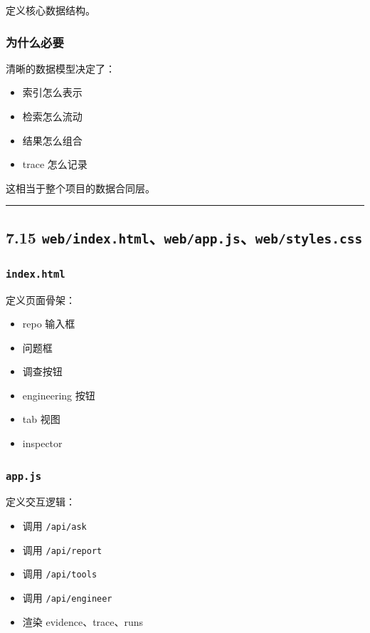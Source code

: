 \documentclass[UTF8,12pt,openany]{ctexbook}
\begin{document}
定义核心数据结构。\par

\subsubsection{为什么必要}

清晰的数据模型决定了：\par

\begin{itemize}
\item 索引怎么表示
\item 检索怎么流动
\item 结果怎么组合
\item trace 怎么记录
\end{itemize}

这相当于整个项目的数据合同层。\par

\hrule

\subsection{7.15 \texttt{web/index.html}、\texttt{web/app.js}、\texttt{web/styles.css}}

\subsubsection{\texttt{index.html}}

定义页面骨架：\par

\begin{itemize}
\item repo 输入框
\item 问题框
\item 调查按钮
\item engineering 按钮
\item tab 视图
\item inspector
\end{itemize}

\subsubsection{\texttt{app.js}}

定义交互逻辑：\par

\begin{itemize}
\item 调用 \texttt{/api/ask}
\item 调用 \texttt{/api/report}
\item 调用 \texttt{/api/tools}
\item 调用 \texttt{/api/engineer}
\item 渲染 evidence、trace、runs
\end{itemize}
\end{document}
